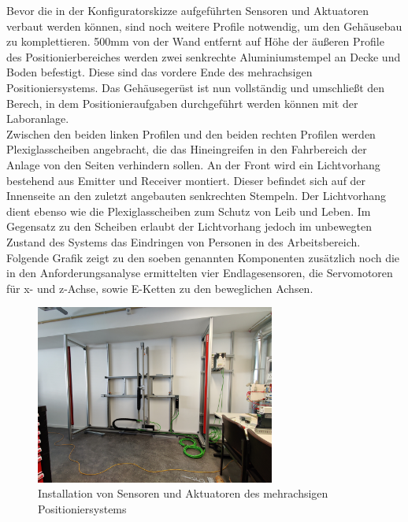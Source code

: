 \documentclass[../../../Bachelorarbeit.tex]{subfiles}
\begin{document}
Bevor die in der Konfiguratorskizze aufgeführten Sensoren und Aktuatoren verbaut werden können, sind noch weitere Profile notwendig, um den Gehäusebau zu komplettieren. 500\si{\mm} von der Wand entfernt auf Höhe der äußeren Profile des Positionierbereiches werden zwei senkrechte Aluminiumstempel an Decke und Boden befestigt. Diese sind das vordere Ende des mehrachsigen Positioniersystems. Das Gehäusegerüst ist nun vollständig und umschließt den Berech, in dem Positionieraufgaben durchgeführt werden können mit der Laboranlage.\\
Zwischen den beiden linken Profilen und den beiden rechten Profilen werden Plexiglasscheiben angebracht, die das Hineingreifen in den Fahrbereich der Anlage von den Seiten verhindern sollen. An der Front wird ein Lichtvorhang bestehend aus Emitter und Receiver montiert. Dieser befindet sich auf der Innenseite an den zuletzt angebauten senkrechten Stempeln. Der Lichtvorhang dient ebenso wie die Plexiglasscheiben zum Schutz von Leib und Leben. Im Gegensatz zu den Scheiben erlaubt der Lichtvorhang jedoch im unbewegten Zustand des Systems das Eindringen von Personen in des Arbeitsbereich.\\
Folgende Grafik zeigt zu den soeben genannten Komponenten zusätzlich noch die in den Anforderungsanalyse ermittelten vier Endlagesensoren, die Servomotoren für x- und z-Achse, sowie E-Ketten zu den beweglichen Achsen.

\begin{figure}[H]
    \centering
    \includegraphics[width=0.7\textwidth]{Images/AktuatorenSensoren.jpg}
    \caption[Aktuator- und Sensorinstallation]{Installation von Sensoren und Aktuatoren des mehrachsigen Positioniersystems}
    \label{fig:my-img22}
\end{figure}
\end{document}
